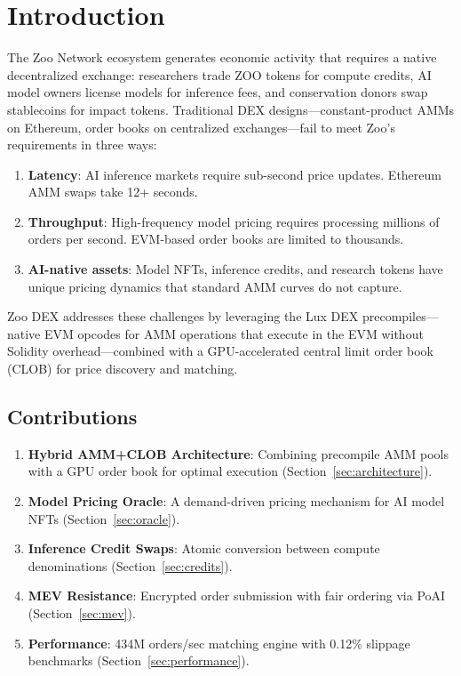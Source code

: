 \section{Introduction}


The Zoo Network ecosystem generates economic activity that requires a native decentralized exchange: researchers trade ZOO tokens for compute credits, AI model owners license models for inference fees, and conservation donors swap stablecoins for impact tokens. Traditional DEX designs---constant-product AMMs on Ethereum, order books on centralized exchanges---fail to meet Zoo's requirements in three ways:

\begin{enumerate}
    \item \textbf{Latency}: AI inference markets require sub-second price updates. Ethereum AMM swaps take 12+ seconds.

    \item \textbf{Throughput}: High-frequency model pricing requires processing millions of orders per second. EVM-based order books are limited to thousands.

    \item \textbf{AI-native assets}: Model NFTs, inference credits, and research tokens have unique pricing dynamics that standard AMM curves do not capture.
\end{enumerate}

Zoo DEX addresses these challenges by leveraging the Lux DEX precompiles---native EVM opcodes for AMM operations that execute in the EVM without Solidity overhead---combined with a GPU-accelerated central limit order book (CLOB) for price discovery and matching.

\subsection{Contributions}

\begin{enumerate}
    \item \textbf{Hybrid AMM+CLOB Architecture}: Combining precompile AMM pools with a GPU order book for optimal execution (Section~\ref{sec:architecture}).

    \item \textbf{Model Pricing Oracle}: A demand-driven pricing mechanism for AI model NFTs (Section~\ref{sec:oracle}).

    \item \textbf{Inference Credit Swaps}: Atomic conversion between compute denominations (Section~\ref{sec:credits}).

    \item \textbf{MEV Resistance}: Encrypted order submission with fair ordering via PoAI (Section~\ref{sec:mev}).

    \item \textbf{Performance}: 434M orders/sec matching engine with 0.12\% slippage benchmarks (Section~\ref{sec:performance}).
\end{enumerate}

